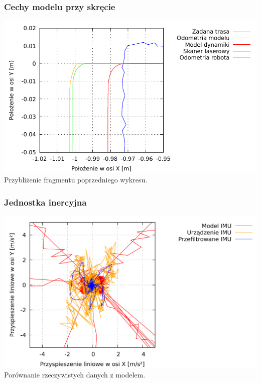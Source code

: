 \documentclass{beamer}
\begin{document}
	\begin{frame}
		\frametitle{Cechy modelu przy skręcie}
		\centering
		\includegraphics[width=\textwidth]{graphics/velmobil_xy_s.pdf} \\
		Przybliżenie fragmentu poprzedniego wykresu.
	\end{frame}
	
	\begin{frame}
		\frametitle{Jednostka inercyjna}
		\centering
		\includegraphics[width=\textwidth]{graphics/imu_xy.png} \\
		Porównanie rzeczywistych danych z modelem.
	\end{frame}
	
\end{document}
